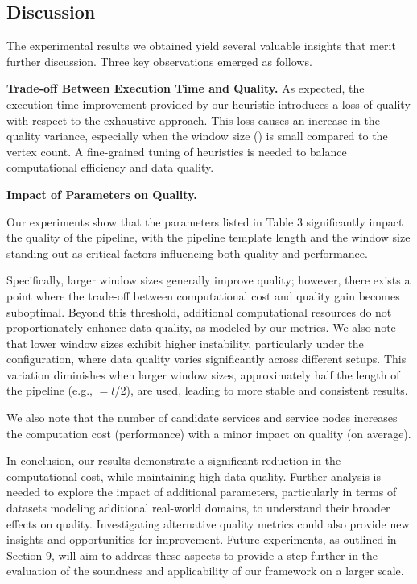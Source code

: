 \subsection{Discussion}
The experimental results we obtained yield several valuable insights that merit further discussion. Three key observations emerged as follows.

\vspace{0.5em}

\noindent\textbf{Trade-off Between Execution Time and Quality.} As expected, the execution time improvement provided by our heuristic introduces a loss of quality with respect to the exhaustive approach. This loss causes an increase in the quality variance, especially when the window size (\windowsize) is small compared to the vertex count. A fine-grained tuning of heuristics is needed to balance computational efficiency and data quality.

\vspace{0.5em}

\noindent\textbf{Impact of Parameters on Quality.}
{\color{OurColor2}
  Our experiments show that the parameters listed in Table 3 significantly impact the quality of the pipeline, with the pipeline template length and the window size standing out as critical factors influencing both quality and performance.

  Specifically, larger window sizes generally improve quality; however, there exists a point where the trade-off between computational cost and quality gain becomes suboptimal. Beyond this threshold, additional computational resources do not proportionately enhance data quality, as modeled by our metrics. We also note that lower window sizes exhibit higher instability, particularly under the \wide configuration, where data quality varies significantly across different setups. This variation diminishes when larger window sizes, approximately half the length of the pipeline (e.g., \windowsize$=$$l$/2), are used, leading to more stable and consistent results.

  We also note that the number of candidate services and service nodes increases the computation cost (performance) with a minor impact on quality (on average).

  In conclusion, our results demonstrate a significant reduction in the computational cost, while maintaining high data quality. Further analysis is needed to explore the impact of additional parameters, particularly in terms of datasets modeling additional real-world domains, to understand their broader effects on quality.
  Investigating alternative quality metrics could also provide new insights and opportunities for improvement. Future experiments, as outlined in Section 9, will aim to address these aspects to provide a step further in the evaluation of the soundness and applicability of our framework on a larger scale.
}
\vspace{0.5em}

